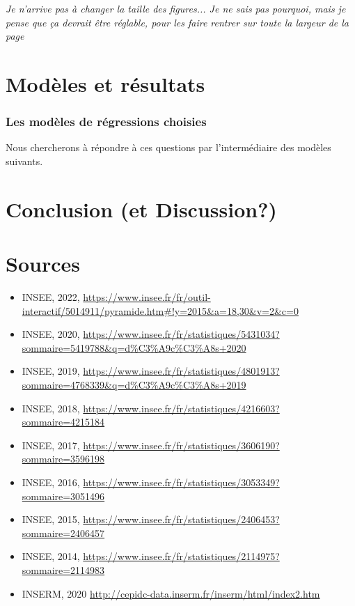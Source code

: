 \documentclass[titlepage]{article}
\begin{document}
\textit{Je n'arrive pas à changer la taille des figures... Je ne sais pas pourquoi, mais je pense que ça devrait être réglable, pour les faire rentrer sur toute la largeur de la page}



\section*{Modèles et résultats}

\subsubsection*{Les modèles de régressions choisies}

Nous chercherons à répondre à ces questions par l'intermédiaire des modèles suivants.


\section*{Conclusion (et Discussion?)}






\section*{Sources} \label{source}

\begin{itemize}
\item INSEE, 2022, \url{https://www.insee.fr/fr/outil-interactif/5014911/pyramide.htm#!y=2015&a=18,30&v=2&c=0}

\item INSEE, 2020, \url{https://www.insee.fr/fr/statistiques/5431034?sommaire=5419788&q=d\%C3\%A9c\%C3\%A8s+2020}
\item INSEE, 2019, \url{https://www.insee.fr/fr/statistiques/4801913?sommaire=4768339&q=d\%C3\%A9c\%C3\%A8s+2019}
\item INSEE, 2018, \url{https://www.insee.fr/fr/statistiques/4216603?sommaire=4215184}
\item INSEE, 2017, \url{https://www.insee.fr/fr/statistiques/3606190?sommaire=3596198}
\item INSEE, 2016, \url{https://www.insee.fr/fr/statistiques/3053349?sommaire=3051496}
\item INSEE, 2015, \url{https://www.insee.fr/fr/statistiques/2406453?sommaire=2406457}
\item INSEE, 2014, \url{https://www.insee.fr/fr/statistiques/2114975?sommaire=2114983}

\item INSERM, 2020 \url{http://cepidc-data.inserm.fr/inserm/html/index2.htm}
\end{itemize}
\end{document}
